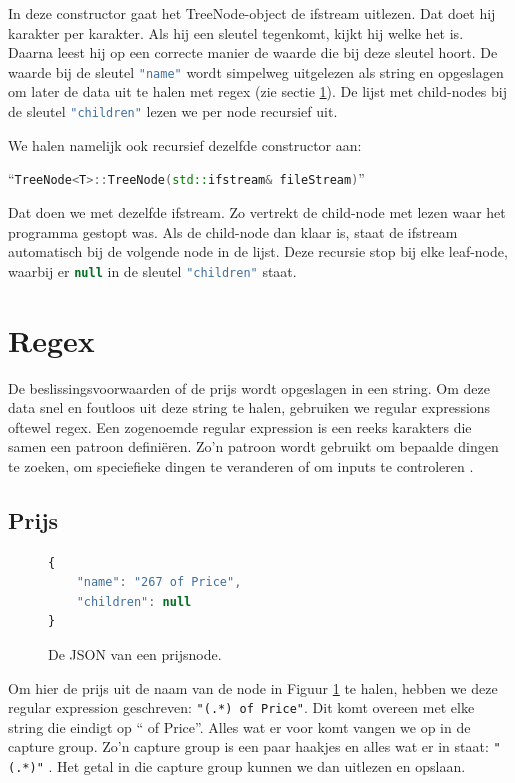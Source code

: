 In deze constructor gaat het TreeNode-object de ifstream uitlezen. Dat doet hij karakter per karakter. Als hij een sleutel tegenkomt, kijkt hij welke het is. Daarna leest hij op een correcte manier de waarde die bij deze sleutel hoort. De waarde bij de sleutel \lstinline[language=JavaScript]{"name"} wordt simpelweg uitgelezen als string en opgeslagen om later de data uit te halen met regex (zie sectie \ref{sec:regex}). De lijst met child-nodes bij de sleutel \lstinline[language=JavaScript]{"children"} lezen we per node recursief uit.

We halen namelijk ook recursief dezelfde constructor aan:
\nopagebreak

``\lstinline[language=C++]{TreeNode<T>::TreeNode(std::ifstream& fileStream)}''
\nopagebreak

Dat doen we met dezelfde ifstream. Zo vertrekt de child-node met lezen waar het programma gestopt was. Als de child-node dan klaar is, staat de ifstream automatisch bij de volgende node in de lijst.
Deze recursie stop bij elke leaf-node, waarbij er \lstinline[language=JavaScript]{null} in de sleutel \lstinline[language=JavaScript]{"children"} staat.


\section{Regex} \label{sec:regex}
De beslissingsvoorwaarden of de prijs wordt opgeslagen in een string. Om deze data snel en foutloos uit deze string te halen, gebruiken we regular expressions oftewel regex. Een zogenoemde regular expression is een reeks karakters die samen een patroon definiëren. Zo'n patroon wordt gebruikt om bepaalde dingen te zoeken, om speciefieke dingen te veranderen of om inputs te controleren \cite{wiki:regex}.

\newpage

\subsection{Prijs}
\begin{figure}[ht]
    \centering
    \begin{lstlisting}[language=JavaScript]
{
    "name": "267 of Price",
    "children": null
}
        \end{lstlisting}
    \caption{De JSON van een prijsnode.}
    \label{fig:json_leaf}
\end{figure}


Om hier de prijs uit de naam van de node in Figuur \ref{fig:json_leaf} te halen, hebben we deze regular expression geschreven: \lstinline{"(.*) of Price"}. Dit komt overeen met elke string die eindigt op `` of Price''. Alles wat er voor komt vangen we op in de capture group. Zo'n capture group is een paar haakjes en alles wat er in staat: \lstinline{"(.*)"} \cite{Goyvaerts2017}. Het getal in die capture group kunnen we dan uitlezen en opslaan.

